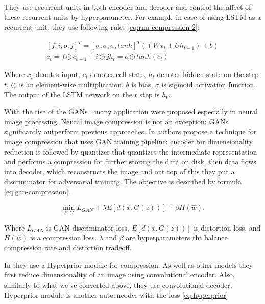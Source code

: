 They use recurrent units in both encoder and decoder and control the affect of these recurrent units by hyperparameter. For example in case of using LSTM as a recurrent unit, they use following rules \ref{eq:rnn-compression-2}:

\begin{equation}
    \label{eq:rnn-compression-2}
    \begin{split}
        [f, i, o, j]^T = [\sigma, \sigma, \sigma, tanh]^T((W x_t + U h_{t-1}) + b) \\
        c_t = f \odot c_{t-1} + i \odot j
        h_t = o \odot tanh(c_t)
    \end{split}
\end{equation}

Where $x_t$ denotes input, $c_t$ denotes cell state, $h_t$ denotes hidden state on the step $t$, $\odot$ is an element-wise multiplication, $b$ is bias, $\sigma$ is sigmoid activation function. The output of the LSTM network on the $t$ step is $h_t$.

With the rise of the GANs \cite{Goodfellow_Pouget-Abadie_Mirza_Xu_Warde-Farley_Ozair_Courville_Bengio_2014}, many application were proposed especially in neural image processing. Neural image compression is not an exception: GANs significantly outperform previous approaches. In \cite{agustsson_generative_2019} authors propose a technique for image compression that uses GAN training pipeline: encoder for dimensionality reduction is followed by quantizer that quantizes the intermediate representation and performs a compression for further storing the data on disk, then data flows into decoder, which reconstructs the image and ont top of this they put a discriminator for adversarial training. The objective is described by formula \ref{eq:gan-compression}.

\begin{equation}
    \label{eq:gan-compression}
    \min_{E,G} L_{GAN} + \lambda E[d(x, G(z))] + \beta H(\hat{w}).
\end{equation}

Where $L_{GAN}$ is GAN discriminator loss, $E[d(x, G(z))]$ is distortion loss, and $H(\hat{w})$ is a compression loss. $\lambda$ and $\beta$ are hyperparameters tht balance compression rate and distortion tradeoff.

In \cite{balle_variational_2018, mentzer_high-fidelity_2020} they use a Hyperprior module for compression. As well as other models they first reduce dimensionality of an image using convolutional encoder. Also, similarly to what we've converted above, they use convolutional decoder. Hyperprior module is another autoencoder with the loss \ref{eq:hyperprior}

